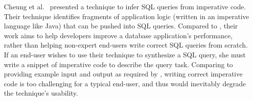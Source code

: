 Cheung et al.~\cite{abs-1208-2013} presented a technique to infer SQL
queries from imperative code. Their technique identifies
fragments of application logic (written in an imperative language
like Java) that can be pushed into SQL queries. 
Compared to \ourtool, their work aims to help developers
improve a database application's performance,
rather than helping non-expert end-users
write correct SQL queries from scratch. 
If an end-user wishes to use their technique to 
synthesize a SQL query, she must write a snippet of
imperative code to describe the query task.
Comparing to providing example input
and output as required by \ourtool,
writing correct imperative code is too challenging
for a typical end-user, and thus would
inevitably degrade the technique's usability.


